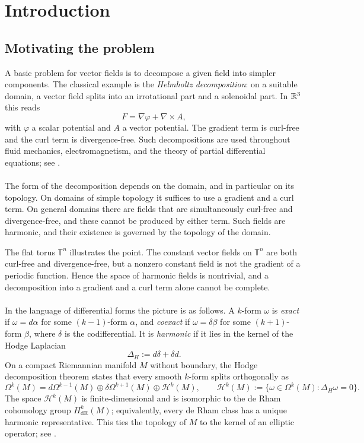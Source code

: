 
\chapter*{Introduction}
\label{chap:introduction}

\section*{Motivating the problem}

A basic problem for vector fields is to decompose a given field into
simpler components. The classical example is the \emph{Helmholtz
decomposition}: on a suitable domain, a vector field splits into an
irrotational part and a solenoidal part. In $\mathbb{R}^3$ this reads
\[
    F = \nabla\varphi + \nabla\times A,
\]
with $\varphi$ a scalar potential and $A$ a vector potential. The
gradient term is curl-free and the curl term is divergence-free. Such
decompositions are used throughout fluid mechanics, electromagnetism,
and the theory of partial differential equations; see
\cite{CantarellaDeTurckGluck2002,Temam1977}.
\\\\ The form of the decomposition depends on the domain, and in particular
on its topology. On domains of simple topology it suffices to use a
gradient and a curl term. On general domains there are fields that are
simultaneously curl-free and divergence-free, and these cannot be
produced by either term. Such fields are harmonic, and their existence
is governed by the topology of the domain.

The flat torus $\mathbb{T}^n$ illustrates the point. The constant
vector fields on $\mathbb{T}^n$ are both curl-free and divergence-free,
but a nonzero constant field is not the gradient of a periodic
function. Hence the space of harmonic fields is nontrivial, and a
decomposition into a gradient and a curl term alone cannot be complete.
\\\\ In the language of differential forms the picture is as follows. A
$k$-form $\omega$ is \emph{exact} if $\omega=d\alpha$ for some
$(k-1)$-form $\alpha$, and \emph{coexact} if $\omega=\delta\beta$ for
some $(k+1)$-form $\beta$, where $\delta$ is the codifferential. It is
\emph{harmonic} if it lies in the kernel of the Hodge Laplacian
\[
    \Delta_H := d\delta+\delta d .
\]
On a compact Riemannian manifold $M$ without boundary, the Hodge
decomposition theorem states that every smooth $k$-form splits
orthogonally as
\[
    \Omega^k(M)
    =
    d\Omega^{k-1}(M)
    \oplus
    \delta\Omega^{k+1}(M)
    \oplus
    \mathcal{H}^k(M),
    \qquad
    \mathcal{H}^k(M)
    :=
    \{\omega\in\Omega^k(M):\Delta_H\omega=0\}.
\]
The space $\mathcal{H}^k(M)$ is finite-dimensional and is isomorphic
to the de Rham cohomology group $H^k_{\mathrm{dR}}(M)$; equivalently,
every de Rham class has a unique harmonic representative. This ties
the topology of $M$ to the kernel of an elliptic operator; see
\cite{Hodge1952,Warner1983,BottTu1982}.

